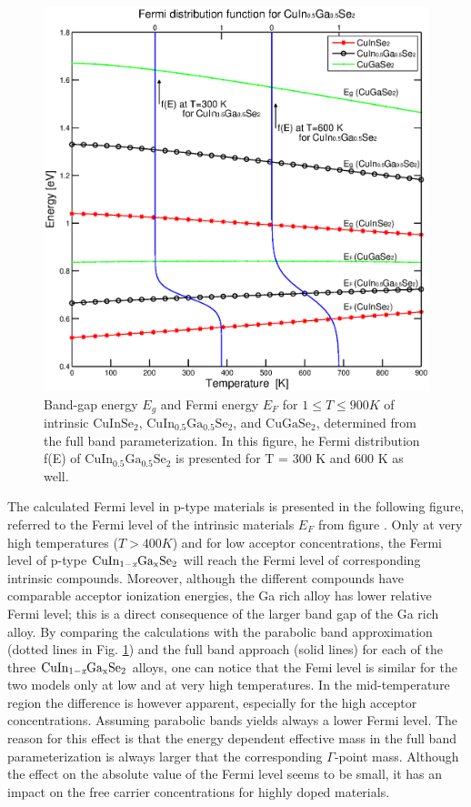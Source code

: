 \documentclass[a4paper, 12pt, titlepage,oneside,drop]{kthesis}
\begin{document}
\begin{figure}[H]
\begin{center}
\includegraphics[scale=.6]{paper2figure7a_1.eps}
\end{center}
\caption{Band-gap energy $E_g$ and Fermi energy $E_F$ for $1 \leq  T \leq 900 K$ of intrinsic  $\mathrm {CuInSe_2}$, $\mathrm {CuIn_{0.5}Ga_{0.5}Se_2}$, and $\mathrm {CuGaSe_2}$, 
determined from the full band parameterization. In this figure, he Fermi distribution f(E) of $\mathrm {CuIn_{0.5}Ga_{0.5}Se_2}$ is presented for T = 300 K and 600 K as well.}
\label{paper2figure7a}
\end{figure}


The calculated Fermi level  in p-type materials is presented in the following figure, referred to the Fermi level of the intrinsic materials $E_F$ from figure
\label{paper2figure7a}. Only at very high temperatures ($T > 400 K$) and for low acceptor concentrations, the Fermi level of p-type $\mathrm { CuIn_{1-\textit{x}}Ga_{x}Se_2}$
will reach the Fermi level of corresponding intrinsic compounds. Moreover, although the different compounds have comparable acceptor ionization energies, 
the Ga rich alloy has lower relative Fermi level; this is a direct consequence of the larger band gap of the Ga rich alloy. By comparing the calculations with
the parabolic band approximation  (dotted lines in Fig. \ref{paper2figure7a}) and the full band approach (solid lines) for each of the three $\mathrm { CuIn_{1-\textit{x}}Ga_{x}Se_2}$ alloys,
one can notice that the Femi level is similar for the two models only at low and at very high temperatures. In the mid-temperature region the difference is 
however apparent, especially for the high acceptor concentrations. Assuming parabolic bands yields always a lower Fermi level. The reason for this effect is 
that the energy dependent effective mass  in the full band parameterization is always larger that the corresponding $\Gamma$-point mass. Although the effect on the
 absolute value of the Fermi level seems to be small, it has an impact on the free carrier concentrations for highly doped materials.
\end{document}
